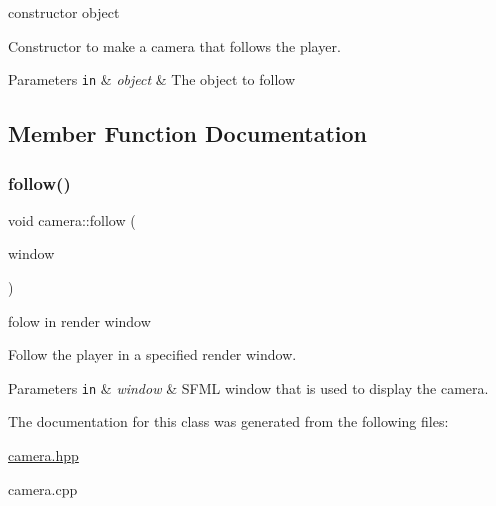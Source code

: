 constructor object 

Constructor to make a camera that follows the player.


\begin{DoxyParams}[1]{Parameters}
\mbox{\tt in}  & {\em object} & The object to follow \\
\hline
\end{DoxyParams}


\subsection{Member Function Documentation}
\mbox{\label{classcamera_a1bb99501ba67453e0ca86f3c8aef5cb1}} 
\subsubsection{\texorpdfstring{follow()}{follow()}}
{\footnotesize\ttfamily void camera\+::follow (\begin{DoxyParamCaption}\item[{sf\+::\+Render\+Window \&}]{window }\end{DoxyParamCaption})}



folow in render window 

Follow the player in a specified render window.


\begin{DoxyParams}[1]{Parameters}
\mbox{\tt in}  & {\em window} & S\+F\+ML window that is used to display the camera. \\
\hline
\end{DoxyParams}


The documentation for this class was generated from the following files\+:\begin{DoxyCompactItemize}
\item 
\hyperlink{camera_8hpp}{camera.\+hpp}\item 
camera.\+cpp\end{DoxyCompactItemize}
